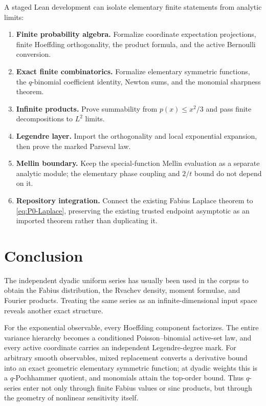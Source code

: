 \documentclass[11pt,oneside]{article}
\theoremstyle{definition}
\theoremstyle{remark}
\begin{document}
A staged Lean development can isolate elementary finite statements from
analytic limits:
\begin{enumerate}
\item \textbf{Finite probability algebra.}  Formalize coordinate expectation
      projections, finite Hoeffding orthogonality, the product formula, and the
      active Bernoulli conversion.
\item \textbf{Exact finite combinatorics.}  Formalize elementary symmetric
      functions, the $q$-binomial coefficient identity, Newton sums, and the
      monomial sharpness theorem.
\item \textbf{Infinite products.}  Prove summability from $p(x)\le x^2/3$ and
      pass finite decompositions to $L^2$ limits.
\item \textbf{Legendre layer.}  Import the orthogonality and local exponential
      expansion, then prove the marked Parseval law.
\item \textbf{Mellin boundary.}  Keep the special-function Mellin evaluation as
      a separate analytic module; the elementary phase coupling and $2/t$
      bound do not depend on it.
\item \textbf{Repository integration.}  Connect the existing Fabius Laplace
      theorem to \eqref{eq:P0-Laplace}, preserving the existing trusted
      endpoint asymptotic as an imported theorem rather than duplicating it.
\end{enumerate}

\section{Conclusion}
\label{sec:conclusion}

The independent dyadic uniform series has usually been used in the corpus to
obtain the Fabius distribution, the Rvachev density, moment formulae, and
Fourier products.  Treating the same series as an infinite-dimensional input
space reveals another exact structure.

For the exponential observable, every Hoeffding component factorizes.  The
entire variance hierarchy becomes a conditioned Poisson--binomial active-set
law, and every active coordinate carries an independent Legendre-degree mark.
For arbitrary smooth observables, mixed replacement converts a derivative
bound into an exact geometric elementary symmetric function; at dyadic weights
this is a $q$-Pochhammer quotient, and monomials attain the top-order bound.
Thus $q$-series enter not only through finite Fabius values or sinc products,
but through the geometry of nonlinear sensitivity itself.
\end{document}

